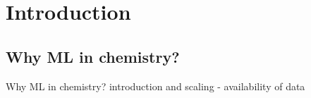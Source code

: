 \section{Introduction}
\subsection{Why ML in chemistry?}
\begin{frame}{Why ML in chemistry?}
introduction and scaling 
- availability of data
\end{frame}